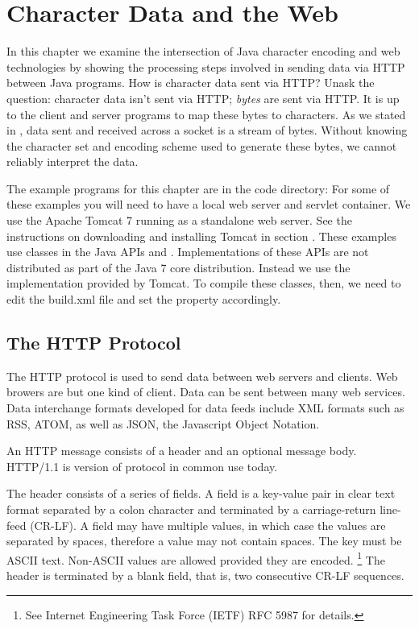 \chapter{Character Data and the Web}\label{chapter:web}

In this chapter we examine the intersection of Java character encoding 
and web technologies by showing the processing steps involved 
in sending data via HTTP between Java programs.
How is character data sent via HTTP?
Unask the question: character data isn't sent via HTTP; \emph{bytes} are sent via HTTP.
It is up to the client and server programs to map these bytes to characters.
As we stated in ,
data sent and received across a socket is a stream of bytes.
Without knowing the character set and encoding scheme used to generate
these bytes, we cannot reliably interpret the data.

The example programs for this chapter are in the code directory:
%
%
For some of these examples you will need to have a local web server and servlet container.
We use the Apache Tomcat 7 running as a standalone web server.
See the instructions on downloading and installing Tomcat in section .
These examples use classes in the Java APIs  and .
Implementations of these APIs are not distributed as part of the Java 7 core distribution.
Instead we use the implementation provided by Tomcat.
To compile these classes, then, we need to edit the build.xml file and set the
property  accordingly.

\section{The HTTP Protocol}

The HTTP protocol is used to send data between web servers and clients.
Web browers are but one kind of client.
Data can be sent between many web services.
Data interchange formats developed for data feeds include XML formats such as
RSS, ATOM, as well as JSON, the Javascript Object Notation.

An HTTP message consists of a header and an optional message body.
HTTP/1.1 is version of protocol in common use today.

The header consists of a series of fields.
A field is a key-value pair in clear text format separated by a colon character
and terminated by a carriage-return line-feed (CR-LF).
A field may have multiple values, in which case the values are separated by spaces,
therefore a value may not contain spaces.
The key must be ASCII text.
Non-ASCII values are allowed provided they are encoded.%
%
\footnote{See Internet Engineering Task Force (IETF) RFC 5987 for details.}
%
The header is terminated by a blank field, that is, two consecutive CR-LF sequences.

